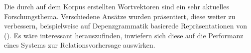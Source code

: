 Die durch auf dem Korpus erstellten Wortvektoren sind ein sehr aktuelles Forschungsthema. Verschiedene Ansätze wurden
präsentiert, diese weiter zu verbessern, beispielweise auf Depenzgrammatik basierede Repräsentationen von (\cite{levy2014dependency}).
Es wäre interessant herauszufinden, inwiefern sich diese auf die Performanz eines Systems zur Relationsvorhersage
auswirken.
